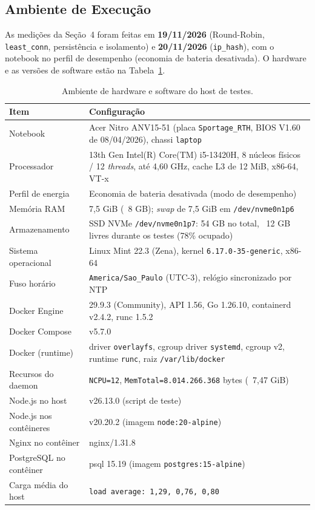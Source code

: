 \documentclass[12pt,a4paper]{article}
\begin{document}
\subsection{Ambiente de Execução}
As medições da Seção~4 foram feitas em \textbf{19/11/2026} (Round-Robin, \texttt{least\_conn}, persistência e isolamento) e \textbf{20/11/2026} (\texttt{ip\_hash}), com o notebook no perfil de desempenho (economia de bateria desativada). O hardware e as versões de software estão na Tabela~\ref{tab:ambiente}.
\begin{table}[h!]
\centering
\small
\begin{tabular}{p{3.9cm}p{10.2cm}}
\toprule
\textbf{Item} & \textbf{Configuração} \\
\midrule
Notebook & Acer Nitro ANV15-51 (placa \texttt{Sportage\_RTH}, BIOS V1.60 de 08/04/2026), chassi \texttt{laptop} \\
Processador & 13th Gen Intel(R) Core(TM) i5-13420H, 8 núcleos físicos / 12 \textit{threads}, até 4,60 GHz, cache L3 de 12 MiB, x86-64, VT-x \\
Perfil de energia & Economia de bateria desativada (modo de desempenho) \\
Memória RAM & 7,5 GiB (~8 GB); \textit{swap} de 7,5 GiB em \texttt{/dev/nvme0n1p6} \\
Armazenamento & SSD NVMe \texttt{/dev/nvme0n1p7}: 54 GB no total, ~12 GB livres durante os testes (78\% ocupado) \\
Sistema operacional & Linux Mint 22.3 (Zena), kernel \texttt{6.17.0-35-generic}, x86-64 \\
Fuso horário & \texttt{America/Sao\_Paulo} (UTC-3), relógio sincronizado por NTP \\
Docker Engine & 29.9.3 (Community), API 1.56, Go 1.26.10, containerd v2.4.2, runc 1.5.2 \\
Docker Compose & v5.7.0 \\
Docker (runtime) & driver \texttt{overlayfs}, cgroup driver \texttt{systemd}, cgroup v2, runtime \texttt{runc}, raiz \texttt{/var/lib/docker} \\
Recursos do daemon & \texttt{NCPU=12}, \texttt{MemTotal=8.014.266.368} bytes (~7,47 GiB) \\
Node.js no host & v26.13.0 (script de teste) \\
Node.js nos contêineres & v20.20.2 (imagem \texttt{node:20-alpine}) \\
Nginx no contêiner & nginx/1.31.8 \\
PostgreSQL no contêiner & psql 15.19 (imagem \texttt{postgres:15-alpine}) \\
Carga média do host & \texttt{load average: 1,29, 0,76, 0,80} \\
\bottomrule
\end{tabular}
\caption{Ambiente de hardware e software do host de testes.}
\label{tab:ambiente}
\end{table}
\end{document}
